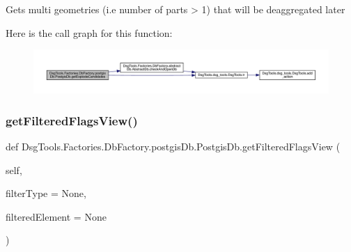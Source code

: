 \begin{DoxyVerb}Gets multi geometries (i.e number of parts > 1) that will be deaggregated later
\end{DoxyVerb}
 Here is the call graph for this function\+:
\nopagebreak
\begin{figure}[H]
\begin{center}
\leavevmode
\includegraphics[width=350pt]{class_dsg_tools_1_1_factories_1_1_db_factory_1_1postgis_db_1_1_postgis_db_a73af37a3d5f70ddac857d96693bb789b_cgraph}
\end{center}
\end{figure}
\mbox{\label{class_dsg_tools_1_1_factories_1_1_db_factory_1_1postgis_db_1_1_postgis_db_a896ec652f3cbba47db10350f8d3ea7bb}} 
\subsubsection{\texorpdfstring{get\+Filtered\+Flags\+View()}{getFilteredFlagsView()}}
{\footnotesize\ttfamily def Dsg\+Tools.\+Factories.\+Db\+Factory.\+postgis\+Db.\+Postgis\+Db.\+get\+Filtered\+Flags\+View (\begin{DoxyParamCaption}\item[{}]{self,  }\item[{}]{filter\+Type = {\ttfamily None},  }\item[{}]{filtered\+Element = {\ttfamily None} }\end{DoxyParamCaption})}

